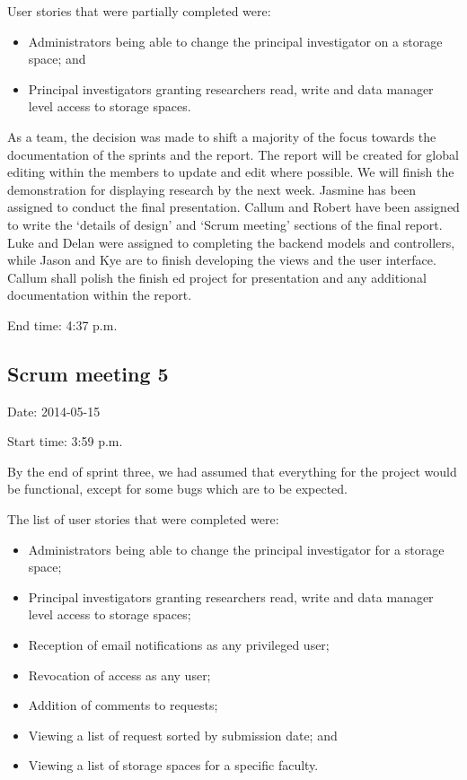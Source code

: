 \documentclass[a4paper,titlepage,12pt]{article}
\begin{document}
User stories that were partially completed were:

\begin{itemize}
	\item Administrators being able to change the principal investigator on
	      a storage space; and
	\item Principal investigators granting researchers read, write and data
	      manager level access to storage spaces.
\end{itemize}

As a team, the decision was made to shift a majority of the focus towards the
documentation of the sprints and the report. The report will be created for
global editing within the members to update and edit where possible. We will
finish the demonstration for displaying research by the next week. Jasmine
has been assigned to conduct the final presentation. Callum and Robert have
been assigned to write the `details of design' and `Scrum meeting' sections of
the final report. Luke and Delan were assigned to completing the backend models
and controllers, while Jason and Kye are to finish developing the views and the
user interface. Callum shall polish the finish ed project for presentation and
any additional documentation within the report.

End time: 4:37 p.m.

\subsection{Scrum meeting 5}

Date: 2014-05-15

Start time: 3:59 p.m.

By the end of sprint three, we had assumed that everything for the project
would be functional, except for some bugs which are to be expected.

The list of user stories that were completed were:

\begin{itemize}
	\item Administrators being able to change the principal investigator
	      for a storage space;
	\item Principal investigators granting researchers read, write and data
	      manager level access to storage spaces;
	\item Reception of email notifications as any privileged user;
	\item Revocation of access as any user;
	\item Addition of comments to requests;
	\item Viewing a list of request sorted by submission date; and
	\item Viewing a list of storage spaces for a specific faculty.
\end{itemize}
\end{document}
